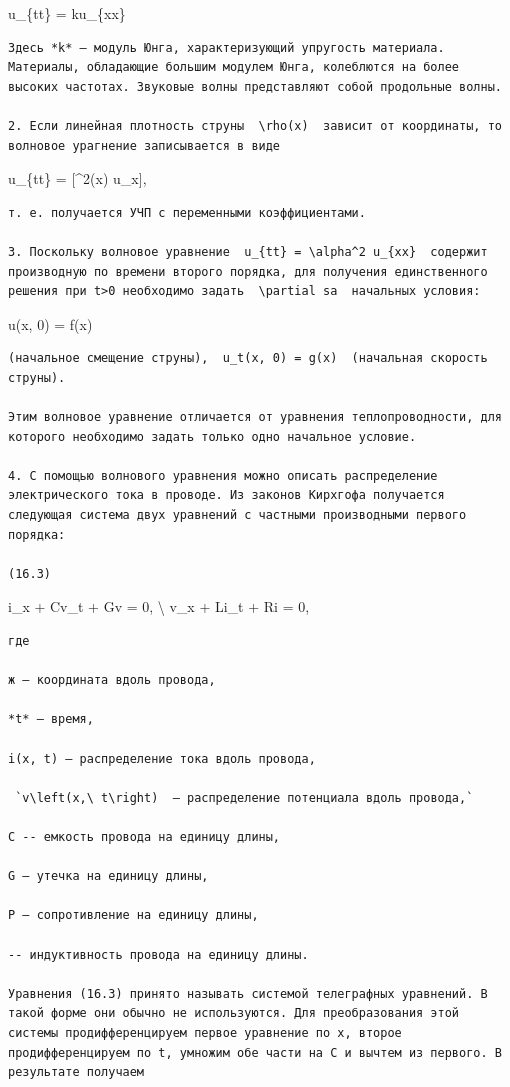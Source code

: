 \documentclass[
  ukrainian,
]{article}
\begin{document}
u\_\{tt\} = ku\_\{xx\}

\begin{verbatim}
Здесь *k* — модуль Юнга, характеризующий упругость материала. Материалы, обладающие большим модулем Юнга, колеблются на более высоких частотах. Звуковые волны представляют собой продольные волны.

2. Если линейная плотность струны  \rho(x)  зависит от координаты, то волновое урагнение записывается в виде
\end{verbatim}

u\_\{tt\} =  {[}\alpha\^{}2(x) u\_x{]},

\begin{verbatim}
т. е. получается УЧП с переменными коэффициентами.

3. Поскольку волновое уравнение  u_{tt} = \alpha^2 u_{xx}  содержит производную по времени второго порядка, для получения единственного решения при t>0 необходимо задать  \partial sa  начальных условия:
\end{verbatim}

u(x, 0) = f(x)

\begin{verbatim}
(начальное смещение струны),  u_t(x, 0) = g(x)  (начальная скорость струны).

Этим волновое уравнение отличается от уравнения теплопроводности, для которого необходимо задать только одно начальное условие.

4. С помощью волнового уравнения можно описать распределение электрического тока в проводе. Из законов Кирхгофа получается следующая система двух уравнений с частными производными первого порядка:

(16.3)
\end{verbatim}

i\_x + Cv\_t + Gv = 0, \textbackslash{} v\_x + Li\_t + Ri = 0,

\begin{verbatim}
где

ж — координата вдоль провода,

*t* — время,

i(x, t) — распределение тока вдоль провода,

 `v\left(x,\ t\right)  — распределение потенциала вдоль провода,`

С -- емкость провода на единицу длины,

G — утечка на единицу длины,

Р — сопротивление на единицу длины,

-- индуктивность провода на единицу длины.

Уравнения (16.3) принято называть системой телеграфных уравнений. В такой форме они обычно не используются. Для преобразования этой системы продифференцируем первое уравнение по x, второе продифференцируем по t, умножим обе части на C и вычтем из первого. В результате получаем
\end{verbatim}
\end{document}
